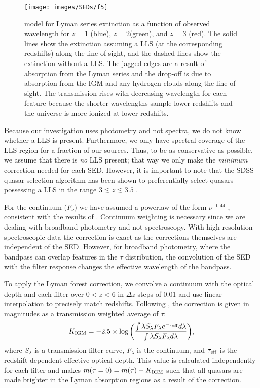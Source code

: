 \begin{figure}[ht]
 \centering
 \texttt{[image: images/SEDs/f5]}
 \caption[Lyman series extinction]{\citet{Meiksin:2006} model for Lyman series extinction as a function of observed wavelength for $z=1$ (blue), $z=2$(green), and $z=3$ (red). The solid lines show the extinction assuming a LLS (at the corresponding redshifts) along the line of sight, and the dashed lines show the extinction without a LLS. The jagged edges are a result of absorption from the Lyman series and the drop-off is due to absorption from the IGM and any hydrogen clouds along the line of sight. The transmission rises with decreasing wavelength for each feature because the shorter wavelengths sample lower redshifts and the universe is more ionized at lower redshifts.}
 \label{meiksin}
\end{figure}

Because our investigation uses photometry and not spectra, we do not know whether a LLS is present.  Furthermore, we only have spectral coverage of the LLS region for a fraction of our sources.  Thus, to be as conservative as possible, we assume that there is {\em no} LLS present; that way we only make the {\em minimum} correction needed for each SED.  However, it is important to note that the SDSS quasar selection algorithm has been shown to preferentially select quasars possessing a LLS in the range $3 \lesssim z \lesssim 3.5$ \citep{Worseck:2011}.

For the continuum ($F_{\nu}$) we have assumed a powerlaw of the form $\nu^{-0.44}$ \citep{Vanden-Berk:2001}, consistent with the results of \citet{Scott:2004}.  Continuum weighting is necessary since we are dealing with broadband photometry and not spectroscopy.   With high resolution spectroscopic data the correction is exact as the \citet{Meiksin:2006} corrections themselves are independent of the SED.  However, for broadband photometry, where the bandpass can overlap features in the $\tau$ distribution, the convolution of the SED with the filter response changes the effective wavelength of the bandpass.

To apply the Lyman forest correction, we convolve a continuum with the \citet{Meiksin:2006} optical depth and each filter over $0<z<6$ in $\Delta z$ steps of 0.01 and use linear interpolation to precisely match redshifts. Following \citet{Meiksin:2006}, the correction is given in magnitudes as a transmission weighted average of $\tau$:
\begin{equation}
K_{\rm IGM} =  -2.5\times \log{\left( \frac{\int \lambda S_{\lambda} F_{\lambda} e^{-\tau_{{\rm eff}}} d\lambda}{\int \lambda S_{\lambda} F_{\lambda} d\lambda} \right)},
\end{equation} where $S_{\lambda}$ is a transmission filter curve, $F_{\lambda}$ is the continuum, and $\tau_{{\rm eff}}$ is the redshift-dependent effective optical depth. This value is calculated independently for each filter and makes $m(\tau=0) = m(\tau)-K_{\rm IGM}$ such that all quasars are made brighter in the Lyman absorption regions as a result of the correction.  

